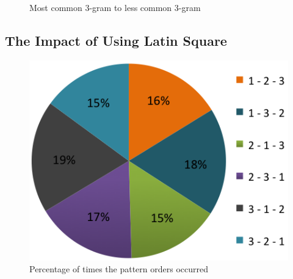 		\begin{figure}[H]
	    \caption{Most common 3-gram to less common 3-gram}
	    \label{fig:3gram}
	  \end{figure}

	\clearpage
	\subsection{The Impact of Using Latin Square} \label{sec:latinsquareimpact}

		\begin{figure}[H]
      \centering
      \includegraphics[scale=0.5]{pics/analysis/patternOrder.png}
      \caption{Percentage of times the pattern orders occurred}
      \label{fig:patternOrder}
    \end{figure}

